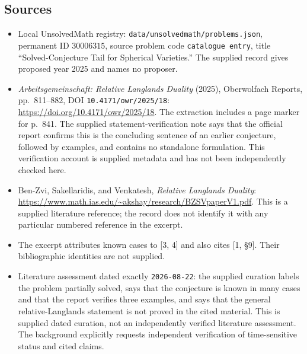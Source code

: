 \documentclass[11pt]{article}
\begin{document}
\subsection{Sources}
\begin{itemize}
\item Local UnsolvedMath registry: \texttt{data/unsolvedmath/problems.json}, permanent ID \(30006315\), source problem code \texttt{catalogue entry}, title ``Solved-Conjecture Tail for Spherical Varieties.'' The supplied record gives proposed year 2025 and names no proposer.
\item \emph{Arbeitsgemeinschaft: Relative Langlands Duality} (2025), Oberwolfach Reports, pp.\ 811--882, DOI \texttt{10.4171/owr/2025/18}: \url{https://doi.org/10.4171/owr/2025/18}. The extraction includes a page marker for p.\ 841. The supplied statement-verification note says that the official report confirms this is the concluding sentence of an earlier conjecture, followed by examples, and contains no standalone formulation. This verification account is supplied metadata and has not been independently checked here.
\item Ben-Zvi, Sakellaridis, and Venkatesh, \emph{Relative Langlands Duality}: \url{https://www.math.ias.edu/~akshay/research/BZSVpaperV1.pdf}. This is a supplied literature reference; the record does not identify it with any particular numbered reference in the excerpt.
\item The excerpt attributes known cases to [3, 4] and also cites [1, \S 9]. Their bibliographic identities are not supplied.
\item Literature assessment dated exactly \texttt{2026-08-22}: the supplied curation labels the problem partially solved, says that the conjecture is known in many cases and that the report verifies three examples, and says that the general relative-Langlands statement is not proved in the cited material. This is supplied dated curation, not an independently verified literature assessment. The background explicitly requests independent verification of time-sensitive status and cited claims.
\end{itemize}
\end{document}
